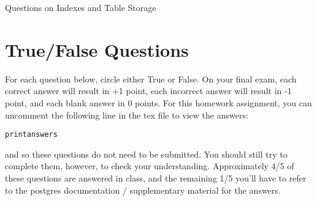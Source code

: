 \documentclass{exam}
\theoremstyle{definition}
\begin{document}
\begin{center}
\Huge
Questions on Indexes and Table Storage
\end{center}


\section{True/False Questions}

For each question below, circle either True or False.
On your final exam,
each correct answer will result in +1 point,
each incorrect answer will result in -1 point,
and each blank answer in 0 points.
For this homework assignment, you can uncomment the following line in the tex file to view the answers:
\begin{verbatim}
printanswers
\end{verbatim}
and so these questions do not need to be submitted.
You should still try to complete them, however, to check your understanding.
Approximately 4/5 of these questions are answered in class,
and the remaining 1/5 you'll have to refer to the postgres documentation / supplementary material for the answers.
\end{document}
